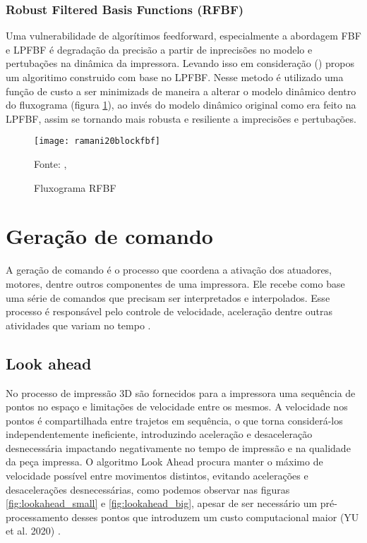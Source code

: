 \subsubsection{Robust Filtered Basis Functions (RFBF)}
Uma vulnerabilidade de algorítimos feedforward,
especialmente a abordagem FBF e LPFBF é degradação
da precisão a partir de inprecisões no modelo e
pertubações na dinâmica da impressora.
Levando isso em consideração \citeauthor{ramani20} (\citeyear{ramani20})
propos um algoritimo construido com base no LPFBF.
Nesse metodo é utilizado uma função de custo a ser minimizads
de maneira a alterar o modelo dinâmico dentro do fluxograma (figura \ref{fig:flowchart_rfbf}), ao invés
do modelo dinâmico original como era feito na LPFBF, assim se tornando
mais robusta e resiliente a imprecisões e pertubações.

\begin{figure}[!htb]
    \centering
    \caption{Fluxograma RFBF}
    \texttt{[image: ramani20blockfbf]}

    {\footnotesize Fonte: \citeauthor{ramani20}, \citeyear{ramani20}}
    \label{fig:flowchart_rfbf}
\end{figure}

\section{Geração de comando}
A geração de comando é o processo que coordena a ativação dos 
atuadores, motores, dentre outros componentes de uma impressora. 
Ele recebe como base uma série de comandos que precisam ser 
interpretados e interpolados. Esse processo é responsável pelo 
controle de velocidade, aceleração dentre outras atividades que 
variam no tempo \cite{yu20}. 

\subsection{Look ahead}
No processo de impressão 3D são fornecidos para a impressora 
uma sequência de pontos no espaço e limitações de velocidade 
entre os mesmos. A velocidade nos pontos é compartilhada entre 
trajetos em sequência, o que torna considerá-los 
independentemente ineficiente, introduzindo aceleração e 
desaceleração desnecessária impactando negativamente no tempo 
de impressão e na qualidade da peça impressa.
O algoritmo Look Ahead procura manter o máximo de velocidade 
possível entre movimentos distintos, evitando acelerações e 
desacelerações desnecessárias, como podemos observar nas figuras 
\ref{fig:lookahead_small} e \ref{fig:lookahead_big}, 
apesar de ser necessário um 
pré-processamento desses pontos que introduzem um custo 
computacional maior (YU et al. 2020) \cite{yu20, klipperkinematic}.

